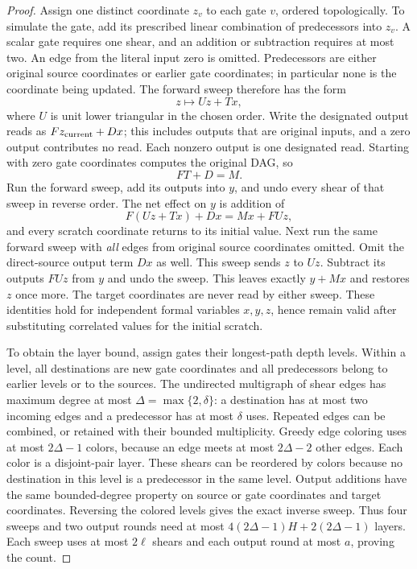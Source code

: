 \begin{proof}
Assign one distinct coordinate $z_v$ to each gate $v$, ordered
topologically.  To simulate the gate, add its prescribed linear
combination of predecessors into $z_v$.  A scalar gate requires one
shear, and an addition or subtraction requires at most two.  An edge
from the literal input zero is omitted.  Predecessors are either
original source coordinates or earlier gate coordinates; in particular
none is the coordinate being updated.  The forward sweep therefore
has the form
\begin{equation}\label{fft:dirty-forward}
 z\longmapsto Uz+Tx,
\end{equation}
where $U$ is unit lower triangular in the chosen order.  Write the
designated output reads as $Fz_{\rm current}+Dx$; this includes outputs
that are original inputs, and a zero output contributes no read.  Each
nonzero output is one designated read.  Starting with zero gate
coordinates computes the original DAG, so
\begin{equation}\label{fft:dirty-output}
 FT+D=M.
\end{equation}
Run the forward sweep, add its outputs into $y$, and undo every shear
of that sweep in reverse order.  The net effect on $y$ is addition of
\[
 F(Uz+Tx)+Dx=Mx+FUz,
\]
and every scratch coordinate returns to its initial value.  Next run
the same forward sweep with \emph{all} edges from original source
coordinates omitted.  Omit the direct-source output term $Dx$ as well.
This sweep sends $z$ to $Uz$.  Subtract its outputs $FUz$ from $y$ and
undo the sweep.  This leaves exactly $y+Mx$ and restores $z$ once more.
The target coordinates are never read by either sweep.  These identities
hold for independent formal variables $x,y,z$, hence remain valid after
substituting correlated values for the initial scratch.

To obtain the layer bound, assign gates their longest-path depth
levels.  Within a level, all destinations are new gate coordinates and
all predecessors belong to earlier levels or to the sources.  The
undirected multigraph of shear edges has maximum degree at most
$\Delta=\max\{2,\delta\}$: a destination has at most two incoming
edges and a predecessor has at most $\delta$ uses.  Repeated edges can
be combined, or retained with their bounded multiplicity.  Greedy edge
coloring uses at most $2\Delta-1$ colors, because an edge meets at most
$2\Delta-2$ other edges.  Each color is a disjoint-pair layer.  These
shears can be reordered by colors because no destination in this
level is a predecessor in the same level.  Output additions have the
same bounded-degree property on source or gate coordinates and target
coordinates.  Reversing the colored levels gives the exact inverse
sweep.  Thus four sweeps and two output rounds need at most
$4(2\Delta-1)H+2(2\Delta-1)$ layers.  Each sweep uses at most
$2\ell$ shears and each output round at most $a$, proving the count.
\end{proof}

